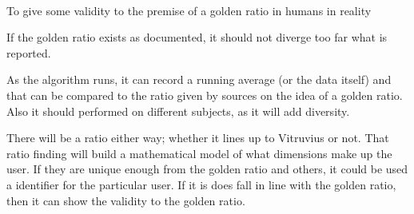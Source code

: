 \documentclass[../exps.tex]{subfiles}
\begin{document}
\pagestyle{empty}

 \\


To give some validity to the premise of a golden ratio in humans in reality
\\


If the golden ratio exists as documented, it should not diverge too far what is reported.
\\


As the algorithm runs, it can record a running average (or the data itself) and that can be compared to the ratio given by sources on the idea of a golden ratio. Also it should performed on different subjects, as it will add diversity.
\\


There will be a ratio either way; whether it lines up to Vitruvius or not. That ratio finding will build a mathematical model of what dimensions make up the user. If they are unique enough from the golden ratio and others, it could be used a identifier for the particular user. If it is does fall in line with the golden ratio, then it can show the validity to the golden ratio.
\\
\end{document}
